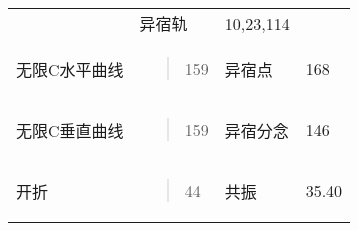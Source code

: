 \documentclass{article}
\begin{document}
\begin{longtable}[]{@{}llll@{}}
\begin{minipage}[t]{0.22\columnwidth}
\end{minipage} & \begin{minipage}[t]{0.22\columnwidth}\raggedright
异宿轨\strut
\end{minipage} & \begin{minipage}[t]{0.22\columnwidth}\raggedright
10,23,114\strut
\end{minipage}\tabularnewline
\begin{minipage}[t]{0.22\columnwidth}\raggedright
无限C水平曲线\strut
\end{minipage} & \begin{minipage}[t]{0.22\columnwidth}\raggedright
\begin{quote}
159
\end{quote}\strut
\end{minipage} & \begin{minipage}[t]{0.22\columnwidth}\raggedright
异宿点\strut
\end{minipage} & \begin{minipage}[t]{0.22\columnwidth}\raggedright
168\strut
\end{minipage}\tabularnewline
\begin{minipage}[t]{0.22\columnwidth}\raggedright
无限C垂直曲线\strut
\end{minipage} & \begin{minipage}[t]{0.22\columnwidth}\raggedright
\begin{quote}
159
\end{quote}\strut
\end{minipage} & \begin{minipage}[t]{0.22\columnwidth}\raggedright
异宿分念\strut
\end{minipage} & \begin{minipage}[t]{0.22\columnwidth}\raggedright
146\strut
\end{minipage}\tabularnewline
\begin{minipage}[t]{0.22\columnwidth}\raggedright
开折\strut
\end{minipage} & \begin{minipage}[t]{0.22\columnwidth}\raggedright
\begin{quote}
44
\end{quote}\strut
\end{minipage} & \begin{minipage}[t]{0.22\columnwidth}\raggedright
共振\strut
\end{minipage} & \begin{minipage}[t]{0.22\columnwidth}\raggedright
35.40\strut
\end{minipage}\tabularnewline

\end{longtable}
\end{document}
